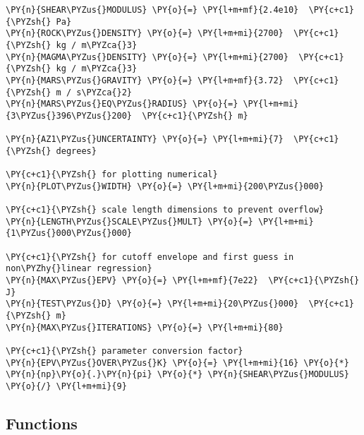 \begin{tcolorbox}[breakable, size=fbox, boxrule=1pt, pad at break*=1mm,colback=cellbackground, colframe=cellborder]
\begin{Verbatim}[commandchars=\\\{\}]
\PY{n}{SHEAR\PYZus{}MODULUS} \PY{o}{=} \PY{l+m+mf}{2.4e10}  \PY{c+c1}{\PYZsh{} Pa}
\PY{n}{ROCK\PYZus{}DENSITY} \PY{o}{=} \PY{l+m+mi}{2700}  \PY{c+c1}{\PYZsh{} kg / m\PYZca{}3}
\PY{n}{MAGMA\PYZus{}DENSITY} \PY{o}{=} \PY{l+m+mi}{2700}  \PY{c+c1}{\PYZsh{} kg / m\PYZca{}3}
\PY{n}{MARS\PYZus{}GRAVITY} \PY{o}{=} \PY{l+m+mf}{3.72}  \PY{c+c1}{\PYZsh{} m / s\PYZca{}2}
\PY{n}{MARS\PYZus{}EQ\PYZus{}RADIUS} \PY{o}{=} \PY{l+m+mi}{3\PYZus{}396\PYZus{}200}  \PY{c+c1}{\PYZsh{} m}

\PY{n}{AZ1\PYZus{}UNCERTAINTY} \PY{o}{=} \PY{l+m+mi}{7}  \PY{c+c1}{\PYZsh{} degrees}

\PY{c+c1}{\PYZsh{} for plotting numerical}
\PY{n}{PLOT\PYZus{}WIDTH} \PY{o}{=} \PY{l+m+mi}{200\PYZus{}000}

\PY{c+c1}{\PYZsh{} scale length dimensions to prevent overflow}
\PY{n}{LENGTH\PYZus{}SCALE\PYZus{}MULT} \PY{o}{=} \PY{l+m+mi}{1\PYZus{}000\PYZus{}000}

\PY{c+c1}{\PYZsh{} for cutoff envelope and first guess in non\PYZhy{}linear regression}
\PY{n}{MAX\PYZus{}EPV} \PY{o}{=} \PY{l+m+mf}{7e22}  \PY{c+c1}{\PYZsh{} J}
\PY{n}{TEST\PYZus{}D} \PY{o}{=} \PY{l+m+mi}{20\PYZus{}000}  \PY{c+c1}{\PYZsh{} m}
\PY{n}{MAX\PYZus{}ITERATIONS} \PY{o}{=} \PY{l+m+mi}{80}

\PY{c+c1}{\PYZsh{} parameter conversion factor}
\PY{n}{EPV\PYZus{}OVER\PYZus{}K} \PY{o}{=} \PY{l+m+mi}{16} \PY{o}{*} \PY{n}{np}\PY{o}{.}\PY{n}{pi} \PY{o}{*} \PY{n}{SHEAR\PYZus{}MODULUS} \PY{o}{/} \PY{l+m+mi}{9}
\end{Verbatim}
\end{tcolorbox}

\hypertarget{functions}{%
\subsection{Functions}\label{functions}}

